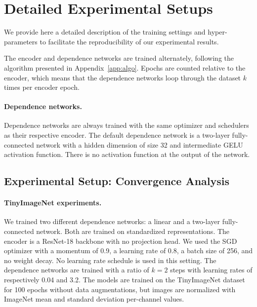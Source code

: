\section{Detailed Experimental Setups} \label{app:detailed_setup}

We provide here a detailed description of the training settings and hyper-parameters to facilitate the reproducibility of our experimental results.

The encoder and dependence networks are trained alternately, following the algorithm presented in Appendix~\ref{app:algo}. Epochs are counted relative to the encoder, which means that the dependence networks loop through the dataset $k$ times per encoder epoch. 

\paragraph{Dependence networks.} Dependence networks are always trained with the same optimizer and schedulers as their respective encoder. The default dependence network is a two-layer fully-connected network with a hidden dimension of size 32 and intermediate GELU~\citep{hendrycks2016gelu} activation function. There is no activation function at the output of the network.

\subsection{Experimental Setup: Convergence Analysis} \label{subapp:setup_convergence}

\paragraph{TinyImageNet experiments.} We trained two different dependence networks: a linear and a two-layer fully-connected network. Both are trained on standardized representations. The encoder is a ResNet-18 backbone with no projection head. We used the SGD optimizer with a momentum of 0.9, a learning rate of 0.8, a batch size of 256, and no weight decay. No learning rate schedule is used in this setting. The dependence networks are trained with a ratio of $k=2$ steps with learning rates of respectively 0.04 and 3.2. 
The models are trained on the TinyImageNet dataset for 100 epochs without data augmentations, but images are normalized with ImageNet mean and standard deviation per-channel values.

